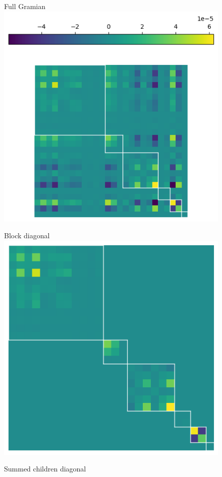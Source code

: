 \begin{figure}
  \centering
  Full Gramian\\
  \includegraphics[width=0.43\linewidth]{../kfac_pinns_exp/exp04_gramian_contributions/fig/gram_full.png}

  \begin{minipage}[t]{0.22\linewidth}
    \centering
    Block diagonal
    \includegraphics[width=\linewidth]{../kfac_pinns_exp/exp04_gramian_contributions/fig/gram_block_diag.png}
  \end{minipage}
  \hfill
  \begin{minipage}[t]{0.22\linewidth}
    \centering
    Summed children diagonal

\end{minipage}
\end{figure}
